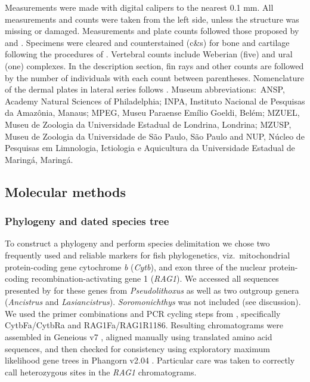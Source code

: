 \documentclass[12pt]{article}
\begin{document}
Measurements were made with digital calipers to the nearest 0.1 mm. %
All measurements and counts were taken from the left side, unless the structure was missing or damaged. %
Measurements and plate counts followed those proposed by \citet{Fisch-Muller2001} and \citet{Bifi2009}. %
Specimens were cleared and counterstained (c\&s) for bone and cartilage following the procedures of \citet{Taylor1985}. %
Vertebral counts include Weberian (five) and ural (one) complexes. %
In the description section, fin rays and other counts are followed by the number of individuals with each count between parentheses. %
Nomenclature of the dermal plates in lateral series follows \citet{Schaefer1997}. %
Museum abbreviations:\ ANSP, Academy Natural Sciences of Philadelphia; INPA, Instituto Nacional de Pesquisas da Amazônia, Manaus; MPEG, Museu Paraense Emílio Goeldi, Belém; MZUEL, Museu de Zoologia da Universidade Estadual de Londrina, Londrina; MZUSP, Museu de Zoologia da Universidade de São Paulo, São Paulo and NUP, Núcleo de Pesquisas em Limnologia, Ictiologia e Aquicultura da Universidade Estadual de Maringá, Maringá.%


\subsection*{Molecular methods}

\subsubsection*{Phylogeny and dated species tree}

To construct a phylogeny and perform species delimitation we chose two frequently used and reliable markers for fish phylogenetics, viz.\ mitochondrial protein-coding gene cytochrome \emph{b} (\emph{Cytb}), and exon three of the nuclear protein-coding recombination-activating gene 1 (\emph{RAG1}). %
We accessed all sequences presented by \citet{Lujan2015phylo} for these genes from \emph{Pseudolithoxus} as well as two outgroup genera (\emph{Ancistrus} and\emph{ Lasiancistrus}). %
\emph{Soromonichthys} was not included (see discussion). %
We used the primer combinations and PCR cycling steps from \citet{Lujan2015phylo}, specifically CytbFa/CytbRa and RAG1Fa/RAG1R1186. Resulting chromatograms were assembled in Geneious v7 \citep{Kearse2012}, aligned manually using translated amino acid sequences, and then checked for consistency using exploratory maximum likelihood gene trees in Phangorn v2.04 \citep{Schliep2011}. %
Particular care was taken to correctly call heterozygous sites in the \emph{RAG1} chromatograms. 
\end{document}
